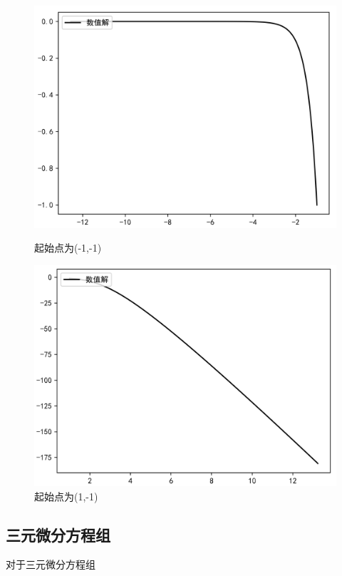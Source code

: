 \documentclass[a4paper]{article}%
\begin{document}
\begin{figure}
    \begin{minipage}{0.48\linewidth}
    \centering
    \includegraphics[scale=0.5]{起始点为(-1,-1)}
    \caption{起始点为(-1,-1)}
    \end{minipage}
    \begin{minipage}{0.48\linewidth}
    \centering
    \includegraphics[scale=0.5]{起始点为(1,-1)}
    \caption{起始点为(1,-1)}
    \end{minipage}
\end{figure}

\subsection{三元微分方程组}
对于三元微分方程组
\end{document}
